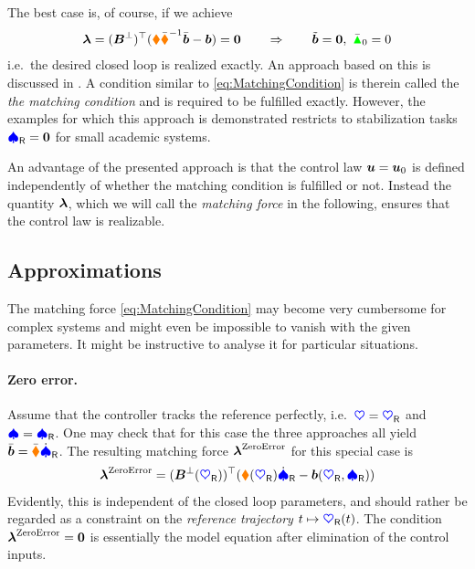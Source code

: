 The best case is, of course, if we achieve 
\begin{align}\label{eq:MatchingCondition}
 \boldsymbol{\lambda} = (\boldsymbol{B}^\bot)^\top (\boldsymbol{\textcolor{orange}{\blacklozenge}} \bar{\boldsymbol{\textcolor{orange}{\blacklozenge}}}^{-1} \bar{\boldsymbol{b}} - \boldsymbol{b}) = \boldsymbol{0}
\qquad \Rightarrow \qquad
 \tilde{\boldsymbol{b}} = \boldsymbol{0}, \ \bar{\textcolor{green}{\blacktriangle}}_0 = 0
\end{align}
i.e.\ the desired closed loop is realized exactly.
An approach based on this is discussed in \cite{bloch2000controlled}.
A condition similar to \eqref{eq:MatchingCondition} is therein called the \textit{the matching condition} and is required to be fulfilled exactly.
However, the examples for which this approach is demonstrated restricts to stabilization tasks $\boldsymbol{\textcolor{blue}{\spadesuit}}_{\mathsf{R}} = \boldsymbol{0}$ for small academic systems.

An advantage of the presented approach is that the control law $\boldsymbol{u} = \boldsymbol{u}_0$ is defined independently of whether the matching condition is fulfilled or not.
Instead the quantity $\boldsymbol{\lambda}$, which we will call the \textit{matching force} in the following, ensures that the control law is realizable.

\subsection{Approximations}
The matching force \eqref{eq:MatchingCondition} may become very cumbersome for complex systems and might even be impossible to vanish with the given parameters.
It might be instructive to analyse it for particular situations.

\paragraph{Zero error.}
Assume that the controller tracks the reference perfectly, i.e.\ $\boldsymbol{\textcolor{blue}{\heartsuit}} = \boldsymbol{\textcolor{blue}{\heartsuit}}_{\mathsf{R}}$ and $\boldsymbol{\textcolor{blue}{\spadesuit}}=\boldsymbol{\textcolor{blue}{\spadesuit}}_{\mathsf{R}}$.
One may check that for this case the three approaches all yield $\bar{\boldsymbol{b}} = \bar{\boldsymbol{\textcolor{orange}{\blacklozenge}}}\dot{\boldsymbol{\textcolor{blue}{\spadesuit}}}_{\mathsf{R}}$.
The resulting matching force $\boldsymbol{\lambda}^{\text{ZeroError}}$ for this special case is
\begin{align}\label{eq:MatchingForceZeroError}
 \boldsymbol{\lambda}^{\text{ZeroError}} = (\boldsymbol{B}^\bot(\boldsymbol{\textcolor{blue}{\heartsuit}}_{\mathsf{R}}))^\top (\boldsymbol{\textcolor{orange}{\blacklozenge}}(\boldsymbol{\textcolor{blue}{\heartsuit}}_{\mathsf{R}}) \dot{\boldsymbol{\textcolor{blue}{\spadesuit}}}_{\mathsf{R}} - \boldsymbol{b}(\boldsymbol{\textcolor{blue}{\heartsuit}}_{\mathsf{R}}, \boldsymbol{\textcolor{blue}{\spadesuit}}_{\mathsf{R}}))
\end{align}
Evidently, this is independent of the closed loop parameters, and should rather be regarded as a constraint on the \textit{reference trajectory} $t\mapsto \boldsymbol{\textcolor{blue}{\heartsuit}}_{\mathsf{R}}(t)$.
The condition $\boldsymbol{\lambda}^{\text{ZeroError}}=\boldsymbol{0}$ is essentially the model equation after elimination of the control inputs.

